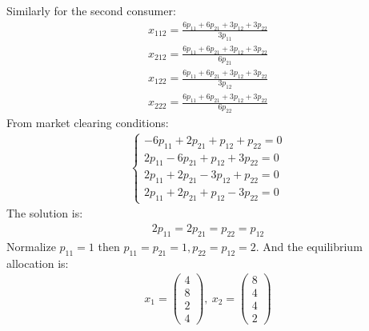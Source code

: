 \documentclass[a4paper]{article}
\begin{document}
Similarly for the second consumer:
\begin{align*}
x_{112} = \frac{6p_{11} + 6p_{21} + 3p_{12} + 3p_{22}}{3p_{11}}\\
x_{212} = \frac{6p_{11} + 6p_{21} + 3p_{12} + 3p_{22}}{6p_{21}}\\
x_{122} = \frac{6p_{11} + 6p_{21} + 3p_{12} + 3p_{22}}{3p_{12}}\\
x_{222} = \frac{6p_{11} + 6p_{21} + 3p_{12} + 3p_{22}}{6p_{22}}
\end{align*}
From market clearing conditions:
\begin{align*}
\begin{cases}
-6p_{11} + 2p_{21} + p_{12} + p_{22} = 0\\
2p_{11} - 6p_{21} + p_{12} + 3p_{22} = 0\\
2p_{11} + 2p_{21} - 3p_{12} + p_{22} = 0\\
2p_{11} + 2p_{21} + p_{12} - 3p_{22} = 0
\end{cases}
\end{align*}
The solution is:
\begin{align*}
2p_{11} = 2p_{21} = p_{22} = p_{12}
\end{align*}
Normalize $p_{11} = 1$ then $p_{11} = p_{21} = 1, p_{22} = p_{12} = 2$. And the equilibrium allocation is:
\begin{align*}
x_1 = \begin{pmatrix}
4\\
8\\
2\\
4
\end{pmatrix},\ x_2 = \begin{pmatrix}
8\\
4\\
4\\
2
\end{pmatrix}
\end{align*}
\end{document}

